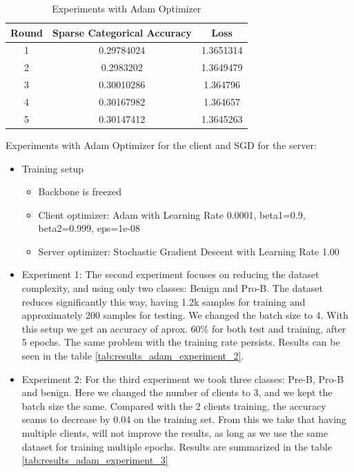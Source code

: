 \documentclass[runningheads,a4paper,11pt]{report}
\begin{document}
\begin{table}[htb]
\centering
\begin{tabular}{|c|c|c|}
\hline
\textbf{Round} & \textbf{Sparse Categorical Accuracy} & \textbf{Loss} \\
\hline
1 & 0.29784024 & 1.3651314 \\
\hline
2 & 0.2983202 & 1.3649479 \\
\hline
3 & 0.30010286 & 1.364796 \\
\hline
4 & 0.30167982 & 1.364657 \\
\hline
5 & 0.30147412 & 1.3645263 \\
\hline
\end{tabular}
\caption{Experiments with Adam Optimizer}
\label{tab:results_adam}
\end{table}

Experiments with Adam Optimizer for the client and SGD for the server:
\begin{itemize}
\item Training setup
\begin{itemize}
    \item Backbone is freezed 
    \item Client optimizer: Adam with Learning Rate 0.0001, beta1=0.9, beta2=0.999, eps=1e-08
    \item Server optimizer: Stochastic Gradient Descent with Learning Rate 1.00
\end{itemize}
\item Experiment 1: The second experiment focuses on reducing the dataset complexity, and using only two classes: Benign and Pro-B. The dataset reduces significantly this way, having 1.2k samples for training and approximately 200 samples for testing. We changed the batch size to 4. With this setup we get an accuracy of aprox. 60\% for both test and training, after 5 epochs. The same problem with the training rate persists. Results can be seen in the table \ref{tab:results_adam_experiment_2}.
\item Experiment 2: For the third experiment we took three classes: Pre-B, Pro-B and benign. Here we changed the number of clients to 3, and we kept the batch size the same. Compared with the 2 clients training, the accuracy seams to decrease by 0.04 on the training set. From this we take that having multiple clients, will not improve the results, as long as we use the same dataset for training multiple epochs. Results are summarized in the table \ref{tab:results_adam_experiment_3}
\end{itemize}
\end{document}
